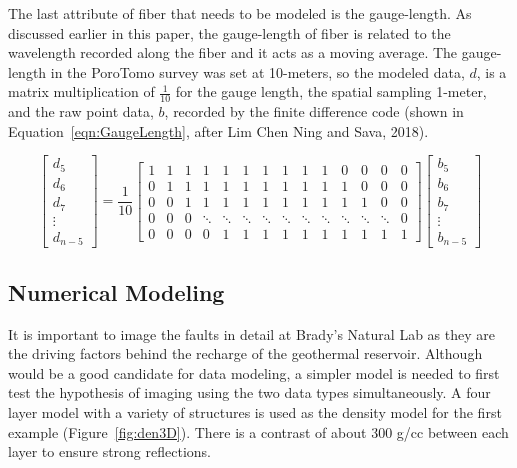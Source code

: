 The last attribute of fiber that needs to be modeled is the gauge-length. As discussed earlier in this paper, the gauge-length of fiber is related to the wavelength recorded along the fiber and it acts as a moving average. The gauge-length in the PoroTomo survey was set at 10-meters, so the modeled data, $d$, is a matrix multiplication of $\frac{1}{10}$ for the gauge length, the spatial sampling 1-meter, and the raw point data, $b$, recorded by the finite difference code (shown in Equation~\ref{eqn:GaugeLength}, after Lim Chen Ning and Sava, 2018).

\setcounter{MaxMatrixCols}{20}
\begin{equation}
\begin{bmatrix}
d_5 \\
d_6 \\
d_7 \\
\vdots \\
d_{n-5}
\end{bmatrix}
=
\frac{1}{10}
\begin{bmatrix}
1 & 1 & 1 & 1 & 1 & 1 & 1 & 1 & 1 & 1 & 0 & 0 & 0 & 0 \\
0 & 1 & 1 & 1 & 1 & 1 & 1 & 1 & 1 & 1 & 1 & 0 & 0 & 0 \\
0 & 0 & 1 & 1 & 1 & 1 & 1 & 1 & 1 & 1 & 1 & 1 & 0 & 0 \\
0 & 0 & 0 & \ddots  & \ddots & \ddots & \ddots & \ddots & \ddots & \ddots & \ddots & \ddots & \ddots & 0\\
0 & 0 & 0 & 0 & 1 & 1 & 1 & 1 & 1 & 1 & 1 & 1 & 1 & 1
\end{bmatrix}
\begin{bmatrix}
  b_5 \\
  b_6 \\
  b_7 \\
  \vdots \\
  b_{n-5}
\end{bmatrix}
\label{eqn:GaugeLength}
\end{equation}


\subsection{Numerical Modeling}
It is important to image the faults in detail at Brady's Natural Lab as they are the driving factors behind the recharge of the geothermal reservoir. Although \citet{siler2013three} would be a good candidate for data modeling, a simpler model is needed to first test the hypothesis of imaging using the two data types simultaneously. A four layer model with a variety of structures is used as the density model for the first example (Figure~\ref{fig:den3D}). There is a contrast of about 300 g/cc between each layer to ensure strong reflections.

